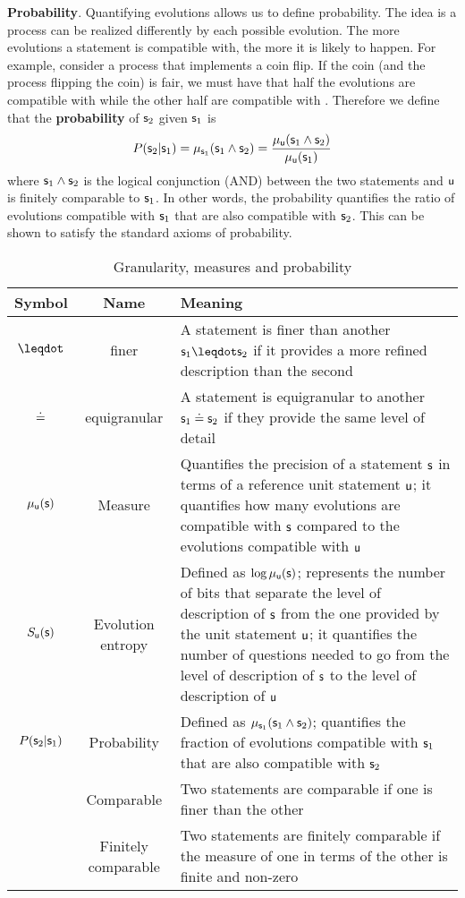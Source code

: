 \documentclass[10pt, onecolumn, longbibliography, nofootinbib]{revtex4-2}
\begin{document}
\textbf{Probability}. Quantifying evolutions allows us to define probability. The idea is a process can be realized differently by each possible evolution. The more evolutions a statement is compatible with, the more it is likely to happen. For example, consider a process that implements a coin flip. If the coin (and the process flipping the coin) is fair, we must have that half the evolutions are compatible with  while the other half are compatible with .  Therefore we define that the \textbf{probability} of $\stmt_2$ given $\stmt_1$ is
\begin{equation}
	P(\stmt_2 | \stmt_1) = \mu_{\stmt_1}(\stmt_1 \AND \stmt_2) = \frac{\mu_{\stmt[u]}(\stmt_1 \AND \stmt_2)}{\mu_{\stmt[u]}(\stmt_1)}
\end{equation} where $\stmt_1 \AND \stmt_2$ is the logical conjunction (AND) between the two statements and $\stmt[u]$ is finitely comparable to $\stmt_1$. In other words, the probability quantifies the ratio of evolutions compatible with $\stmt_1$ that are also compatible with $\stmt_2$. This can be shown to satisfy the standard axioms of probability.

\begin{table}[h!]
	\centering
	\begin{tabular}{|c|c|p{6cm}|}
		\hline 
		Symbol & Name & Meaning \\ 
		\hline 
		$\finer$ & finer & A statement is finer than another $\stmt_1 \finer \stmt_2$ if it provides a more refined description than the second \\ 
		\hline 
		$\eqgran$ & equigranular & A statement is equigranular to another $\stmt_1 \eqgran \stmt_2$ if they provide the same level of detail \\ 
		\hline 
		$\mu_{\stmt[u]}(\stmt)$ & Measure & Quantifies the precision of a statement $\stmt$ in terms of a reference unit statement $\stmt[u]$; it quantifies how many evolutions are compatible with $\stmt$ compared to the evolutions compatible with $\stmt[u]$  \\ 
		\hline 
		$S_{\stmt[u]}(\stmt)$ & Evolution entropy & Defined as $\log \mu_{\stmt[u]}(\stmt)$; represents the number of bits that separate the level of description of $\stmt$ from the one provided by the unit statement $\stmt[u]$; it quantifies the number of questions needed to go from the level of description of $\stmt$ to the level of description of $\stmt[u]$  \\ 
		\hline 
		$P(\stmt_2 | \stmt_1)$ & Probability & Defined as $\mu_{\stmt_1}(\stmt_1 \AND \stmt_2)$; quantifies the fraction of evolutions compatible with $\stmt_1$ that are also compatible with $\stmt_2$  \\ 
		\hline 
		& Comparable & Two statements are comparable if one is finer than the other \\ 
		\hline 
		& Finitely comparable & Two statements are finitely comparable if the measure of one in terms of the other is finite and non-zero \\ 
		\hline 
	\end{tabular} 
	\caption{Granularity, measures and probability}
	\label{table:states}
\end{table}
\end{document}
